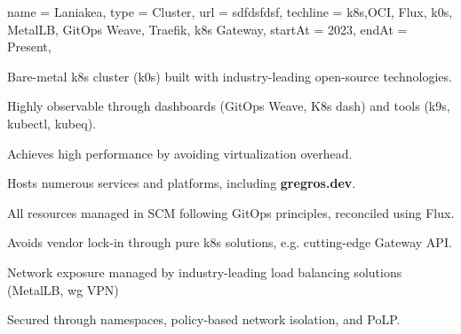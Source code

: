 \begin{projectx}{%
    name = {Laniakea},
    type = {Cluster},
    url = sdfdsfdsf,
    techline = {k8s,OCI, Flux, k0s, MetalLB, GitOps Weave, Traefik,
    k8s Gateway},
    startAt = 2023,
    endAt = Present,
  }
\item Bare-metal k8s cluster (k0s) built with industry-leading
  open-source technologies.
\item Highly observable through dashboards (GitOps Weave, K8s dash)
  and tools (k9s, kubectl, kubeq).
\item Achieves high performance by avoiding virtualization overhead.
\item Hosts numerous services and platforms, including \textbf{gregros.dev}.
\item All resources managed in SCM following GitOps principles,
  reconciled using Flux.
\item Avoids vendor lock-in through pure k8s solutions, e.g.
  cutting-edge Gateway API.
\item Network exposure managed by industry-leading load balancing
  solutions (MetalLB, wg VPN)
\item Secured through namespaces, policy-based network isolation, and PoLP.

\end{projectx}
